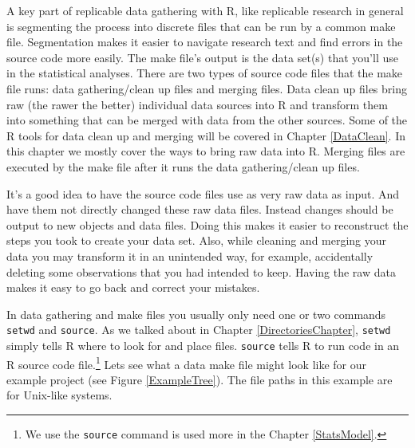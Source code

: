 A key part of replicable data gathering with R, like replicable research in general is segmenting the process into discrete files that can be run by a common make file. Segmentation makes it easier to navigate research text and find errors in the source code more easily. The make file's output is the data set(s) that you'll use in the statistical analyses. There are two types of source code files that the make file runs: data gathering/clean up files and merging files. Data clean up files bring raw (the rawer the better) individual data sources into R and transform them into something that can be merged with data from the other sources. Some of the R tools for data clean up and merging will be covered in Chapter \ref{DataClean}. In this chapter we mostly cover the ways to bring raw data into R. Merging files are executed by the make file after it runs the data gathering/clean up files.

It's a good idea to have the source code files use as very raw data as input. And have them not directly changed these raw data files. Instead changes should be output to new objects and data files. Doing this makes it easier to reconstruct the steps you took to create your data set. Also, while cleaning and merging your data you may transform it in an unintended way, for example, accidentally deleting some observations that you had intended to keep. Having the raw data makes it easy to go back and correct your mistakes. 

In data gathering and make files you usually only need one or two commands {\tt{setwd}} and {\tt{source}}. As we talked about in Chapter \ref{DirectoriesChapter}, {\tt{setwd}} simply tells R where to look for and place files. {\tt{source}} tells R to run code in an R source code file.\footnote{We use the {\tt{source}} command is used more in the Chapter \ref{StatsModel}.}  Lets see what a data make file might look like for our example project (see Figure \ref{ExampleTree}). The file paths in this example are for Unix-like systems.

